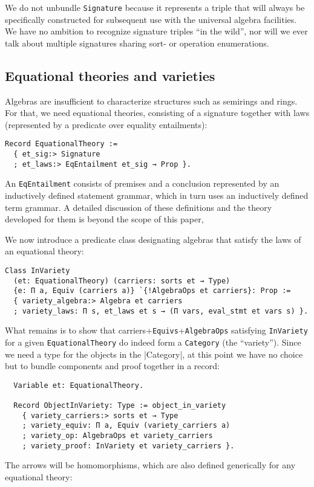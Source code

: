 \documentclass[a4paper,10pt,runningheads]{llncs}
\begin{document}
We do not unbundle \lstinline|Signature| because it represents a triple that will always be specifically constructed for subsequent use with the universal algebra facilities. We have no ambition to recognize signature triples ``in the wild'', nor will we ever talk about multiple signatures sharing sort- or operation enumerations.

\subsection{Equational theories and varieties}
\label{varieties}

Algebras are insufficient to characterize structures such as semirings and rings. For that, we need equational theories, consisting of a signature together with laws (represented by a predicate over equality entailments):
\begin{lstlisting}
Record EquationalTheory :=
  { et_sig:> Signature
  ; et_laws:> EqEntailment et_sig → Prop }.
\end{lstlisting}
An \lstinline|EqEntailment| consists of premises and a conclusion represented by an inductively defined statement grammar, which in turn uses an inductively defined term grammar. A detailed discussion of these definitions and the theory developed for them is beyond the scope of this paper, 

We now introduce a predicate class designating algebras that satisfy the laws of an equational theory:
\begin{lstlisting}
Class InVariety
  (et: EquationalTheory) (carriers: sorts et → Type)
  {e: Π a, Equiv (carriers a)} `{!AlgebraOps et carriers}: Prop :=
  { variety_algebra:> Algebra et carriers
  ; variety_laws: Π s, et_laws et s → (Π vars, eval_stmt et vars s) }.
\end{lstlisting}

What remains is to show that carriers+\lstinline|Equivs|+\lstinline|AlgebraOps| satisfying \lstinline|InVariety| for a given \lstinline|EquationalTheory| do indeed form a \lstinline|Category| (the ``variety''). Since we need a type for the objects in the |Category|, at this point we have no choice but to bundle components and proof together in a record:
\begin{lstlisting}
  Variable et: EquationalTheory.

  Record ObjectInVariety: Type := object_in_variety
    { variety_carriers:> sorts et → Type
    ; variety_equiv: Π a, Equiv (variety_carriers a)
    ; variety_op: AlgebraOps et variety_carriers
    ; variety_proof: InVariety et variety_carriers }.
\end{lstlisting}
The arrows will be homomorphisms, which are also defined generically for any equational theory:
\end{document}
